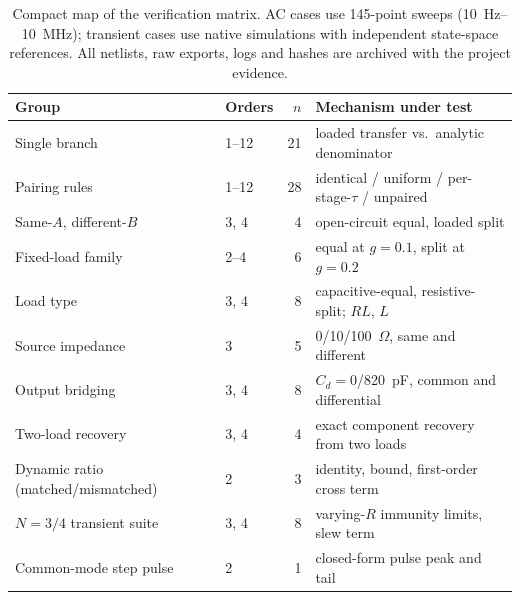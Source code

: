 \begin{table}[htbp]
\centering
\caption{Compact map of the verification matrix. AC cases use 145-point sweeps (10~Hz--10~MHz); transient cases use native simulations with independent state-space references. All netlists, raw exports, logs and hashes are archived with the project evidence.}
\label{tab:case-matrix}
\begin{tabular}{llrl}
\toprule
Group & Orders & $n$ & Mechanism under test \\
\midrule
Single branch & 1--12 & 21 & loaded transfer vs.\ analytic denominator \\
Pairing rules & 1--12 & 28 & identical / uniform / per-stage-$\tau$ / unpaired \\
Same-$A$, different-$B$ & 3, 4 & 4 & open-circuit equal, loaded split \\
Fixed-load family & 2--4 & 6 & equal at $g{=}0.1$, split at $g{=}0.2$ \\
Load type & 3, 4 & 8 & capacitive-equal, resistive-split; $RL$, $L$ \\
Source impedance & 3 & 5 & 0/10/100~$\Omega$, same and different \\
Output bridging & 3, 4 & 8 & $C_d{=}0$/820~pF, common and differential \\
Two-load recovery & 3, 4 & 4 & exact component recovery from two loads \\
\midrule
Dynamic ratio (matched/mismatched) & 2 & 3 & identity, bound, first-order cross term \\
$N{=}3/4$ transient suite & 3, 4 & 8 & varying-$R$ immunity limits, slew term \\
Common-mode step pulse & 2 & 1 & closed-form pulse peak and tail \\
\bottomrule
\end{tabular}
\end{table}
